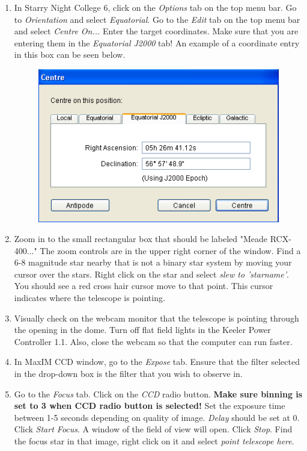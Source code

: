 \documentclass[11pt]{report}
\begin{document}
\begin{enumerate}
\item In Starry Night College 6, click on the \emph{Options} tab on the top menu bar. Go to \emph{Orientation} and select \emph{Equatorial}. Go to the \emph{Edit} tab on the top menu bar and select \emph{Centre On...} Enter the target coordinates. Make sure that you are entering them in the \emph{Equatorial J2000} tab! An example of a coordinate entry in this box can be seen below.
\begin{figure}[!h]
\begin{center}
\includegraphics[totalheight=.2\textheight]{centreon.png}
\end{center}
\end{figure}
\item Zoom in to the small rectangular box that should be labeled "Meade RCX-400..." The zoom controls are in the upper right corner of the window. Find a 6-8 magnitude star nearby that is not a binary star system by moving your cursor over the stars. Right click on the star and select \emph{slew to 'starname'}. You should see a red cross hair cursor move to that point. This cursor indicates where the telescope is pointing. 
\item Visually check on the webcam monitor that the telescope is pointing through the opening in the dome. Turn off flat field lights in the Keeler Power Controller 1.1. Also, close the webcam so that the computer can run faster.
\item In MaxIM CCD window, go to the \emph{Expose} tab. Ensure that the filter selected in the drop-down box is the filter that you wish to observe in.
\item Go to the \emph{Focus} tab. Click on the \emph{CCD} radio button. {\bf Make sure binning is set to 3 when CCD radio button is selected!} Set the exposure time between 1-5 seconds depending on quality of image. \emph{Delay} should be set at 0. Click \emph{Start Focus}. A window of the field of view will open. Click \emph{Stop}. Find the focus star in that image, right click on it and select \emph{point telescope here}.

\end{enumerate}
\end{document}
